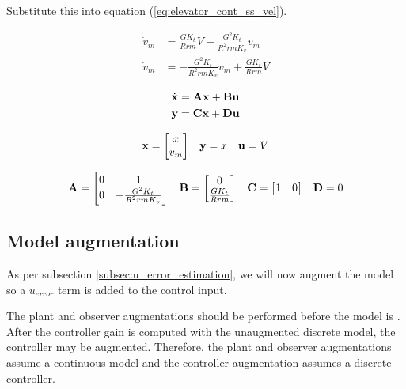 Substitute this into equation (\ref{eq:elevator_cont_ss_vel}).

\begin{align}
  \dot{v}_m &= \frac{GK_t}{Rrm} V - \frac{G^2 K_t}{R^2 rm K_v} v_m \nonumber \\
  \dot{v}_m &= -\frac{G^2 K_t}{R^2 rm K_v} v_m + \frac{GK_t}{Rrm} V
\end{align}

\begin{align*}
  \dot{\mathbf{x}} &= \mathbf{A} \mathbf{x} + \mathbf{B} \mathbf{u} \\
  \mathbf{y} &= \mathbf{C} \mathbf{x} + \mathbf{D} \mathbf{u}
\end{align*}

\begin{align*}
  \begin{array}{ccc}
    \mathbf{x} =
    \begin{bmatrix}
      x \\
      v_m
    \end{bmatrix} &
    \mathbf{y} = x &
    \mathbf{u} = V
  \end{array}
\end{align*}

\begin{equation}
  \begin{array}{cccc}
    \mathbf{A} =
    \begin{bmatrix}
      0 & 1 \\
      0 & -\frac{G^2 K_t}{R^2rmK_v}
    \end{bmatrix} &
    \mathbf{B} =
    \begin{bmatrix}
      0 \\
      \frac{GK_t}{Rrm}
    \end{bmatrix} &
    \mathbf{C} =
    \begin{bmatrix}
      1 & 0
    \end{bmatrix} &
    \mathbf{D} = 0
  \end{array}
\end{equation}

\subsection{Model augmentation}

As per subsection \ref{subsec:u_error_estimation}, we will now augment the
\gls{model} so a $u_{error}$ term is added to the \gls{control input}.

The \gls{plant} and \gls{observer} augmentations should be performed before the
\gls{model} is . After the \gls{controller}
gain is computed with the unaugmented discrete \gls{model}, the controller may
be augmented. Therefore, the \gls{plant} and \gls{observer} augmentations assume
a continuous \gls{model} and the \gls{controller} augmentation assumes a
discrete \gls{controller}.

